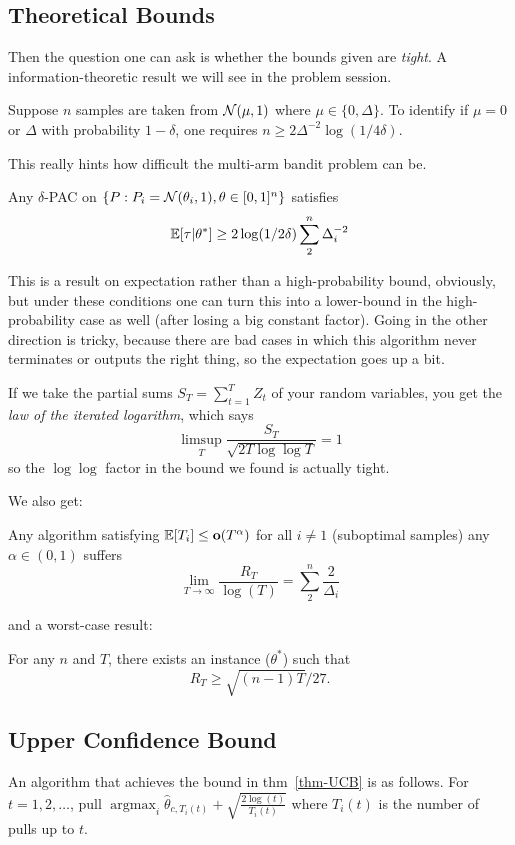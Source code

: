 \documentclass[12pt]{article}
\DeclareMathOperator*{\argmax}{argmax}
\begin{document}
\subsection{Theoretical Bounds}
Then the question one can ask is whether the bounds given are \textit{tight}. A information-theoretic result we will see in the problem session.
\begin{prop}
	Suppose $n$ samples are taken from $\mathcal{N}(\mu,1)$ where $\mu\in\{0,\Delta\}$. To identify if $\mu=0$ or $\Delta$ with probability $1-\delta$,
	one requires $n\ge 2\Delta^{-2}\log(1/4\delta).$
\end{prop}

This really hints how difficult the multi-arm bandit problem can be. 
\begin{thm}
	Any $\delta$-PAC on $\{P:P_i=\mathcal{N}(\theta_i,1),\theta\in[0,1]^n\}$ satisfies 
	\[\mathbb{E}[\tau|\theta^\ast]\ge 2\log(1/2\delta)\sum_2^n\Delta_i^{-2}\]
\end{thm}
\begin{rmk}
	This is a result on expectation rather than a high-probability bound, obviously, but under these conditions one can turn this into a lower-bound in the high-probability case 
	as well (after losing a big constant factor). Going in the other direction is tricky, because there are bad cases in which this algorithm never terminates or outputs the right thing, so the 
	expectation goes up a bit.
\end{rmk}
\begin{rmk}
	If we take the partial sums $S_T=\sum_{t=1}^T Z_t$ of your random variables, you get the \textit{law of the iterated logarithm}, which 
	says 
	\[\limsup_T\frac{S_T}{\sqrt{2T\log\log T}}=1\]
	so the $\log\log$ factor in the bound we found is actually tight.
\end{rmk}
We also get:
\begin{thm}\label{thm-UCB}
	Any algorithm satisfying $\mathbb{E}[T_i]\le\mathbf o(T^\alpha)$ for all $i\ne 1$ (suboptimal samples) any $\alpha\in(0,1)$ suffers 
	\[\lim_{T\to\infty}\frac{R_T}{\log(T)}=\sum_2^n\frac{2}{\Delta_i}\]
\end{thm}
and a worst-case result:
\begin{thm}
	For any $n$ and $T$, there exists an instance ($\theta^\ast$) such that 
	\[R_T\ge\sqrt{(n-1)T}/27.\]
\end{thm}
\subsection{Upper Confidence Bound}
An algorithm that achieves the bound in thm~\ref{thm-UCB} is as follows. For $t=1,2,\dots$,
pull $\argmax_i\hat\theta_{c,T_i(t)}+\sqrt{\frac{2\log(t)}{T_i(t)}}$ where $T_i(t)$ is the number of pulls up to $t$.
\end{document}
